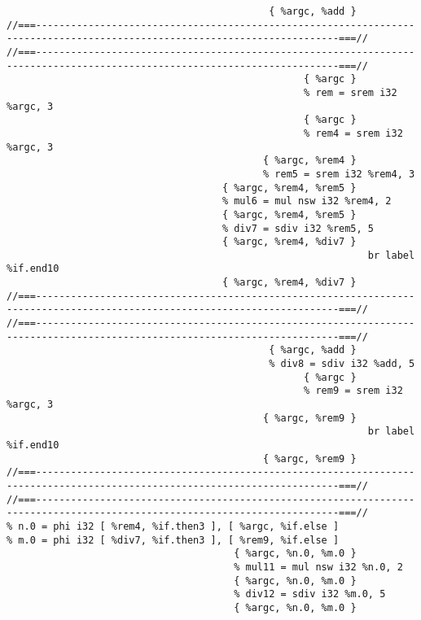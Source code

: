 \begin{verbatim}
                                             { %argc, %add }
//===--------------------------------------------------------------------------------------------------------------------------===//
//===--------------------------------------------------------------------------------------------------------------------------===//
                                                   { %argc }
                                                   % rem = srem i32 %argc, 3
                                                   { %argc }
                                                   % rem4 = srem i32 %argc, 3
                                            { %argc, %rem4 }
                                            % rem5 = srem i32 %rem4, 3
                                     { %argc, %rem4, %rem5 }
                                     % mul6 = mul nsw i32 %rem4, 2
                                     { %argc, %rem4, %rem5 }
                                     % div7 = sdiv i32 %rem5, 5
                                     { %argc, %rem4, %div7 }
                                                              br label %if.end10
                                     { %argc, %rem4, %div7 }
//===--------------------------------------------------------------------------------------------------------------------------===//
//===--------------------------------------------------------------------------------------------------------------------------===//
                                             { %argc, %add }
                                             % div8 = sdiv i32 %add, 5
                                                   { %argc }
                                                   % rem9 = srem i32 %argc, 3
                                            { %argc, %rem9 }
                                                              br label %if.end10
                                            { %argc, %rem9 }
//===--------------------------------------------------------------------------------------------------------------------------===//
//===--------------------------------------------------------------------------------------------------------------------------===//
% n.0 = phi i32 [ %rem4, %if.then3 ], [ %argc, %if.else ]
% m.0 = phi i32 [ %div7, %if.then3 ], [ %rem9, %if.else ]
                                       { %argc, %n.0, %m.0 }
                                       % mul11 = mul nsw i32 %n.0, 2
                                       { %argc, %n.0, %m.0 }
                                       % div12 = sdiv i32 %m.0, 5
                                       { %argc, %n.0, %m.0 }

\end{verbatim}

